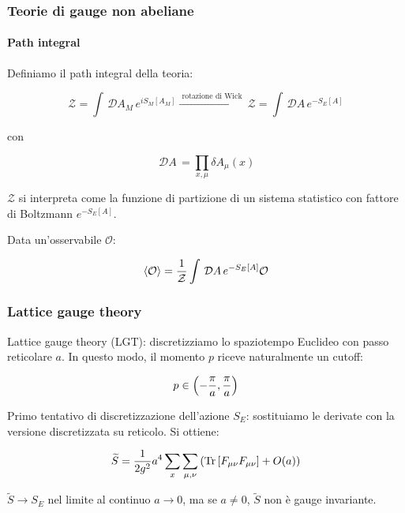 \documentclass{beamer}
\newcommand{\D}[1]{\,\mathcal{D}#1\,}
\newcommand{\Z}{\mathcal{Z}}
\begin{document}
\begin{frame}
	\frametitle{Teorie di gauge non abeliane}
	\framesubtitle{Path integral}
	
	Definiamo il \alert{path integral} della teoria:

	\begin{equation*}
		\Z = \int \D{A_M} e^{iS_M[A_M]} \xrightarrow{\text{ rotazione di Wick }} \Z = \int \D{A} e^{-S_E[A]}
	\end{equation*}

	con

	\begin{equation*}
		\D{A} = \prod_{x, \mu} \delta A_\mu(x)
	\end{equation*}

	$\Z$ si interpreta come la \alert{funzione di partizione} di un sistema statistico con fattore di Boltzmann $e^{-S_E[A]}$.

	Data un'osservabile $\mathcal{O}$:

	\begin{equation*}
		\expval{\mathcal{O}} = \frac{1}{\Z} \int \D{A} e^{-S_E[A]} \mathcal{O}
	\end{equation*}

\end{frame}

\begin{frame}
	\frametitle{Lattice gauge theory}

	\alert{Lattice gauge theory} (LGT): discretizziamo lo spaziotempo Euclideo con passo reticolare $a$.
	In questo modo, il momento $p$ riceve naturalmente un cutoff:

	\begin{equation*}
		p \in \qty(-\frac{\pi}{a}, \frac{\pi}{a})
	\end{equation*}

	Primo tentativo di discretizzazione dell'azione $S_E$: sostituiamo le derivate con la versione discretizzata su reticolo.
	Si ottiene:

	\begin{equation*}
		\widetilde{S} = \frac{1}{2g^2} a^4 \sum_x \sum_{\mu,\nu} \qty(\Tr\qty[F_{\mu\nu}F_{\mu\nu}] + O(a))
	\end{equation*}

	$\widetilde{S} \rightarrow S_E$ nel limite al continuo $a \rightarrow 0$, ma se $a \ne 0$, $\widetilde{S}$
	non è gauge invariante.
\end{frame}
\end{document}
